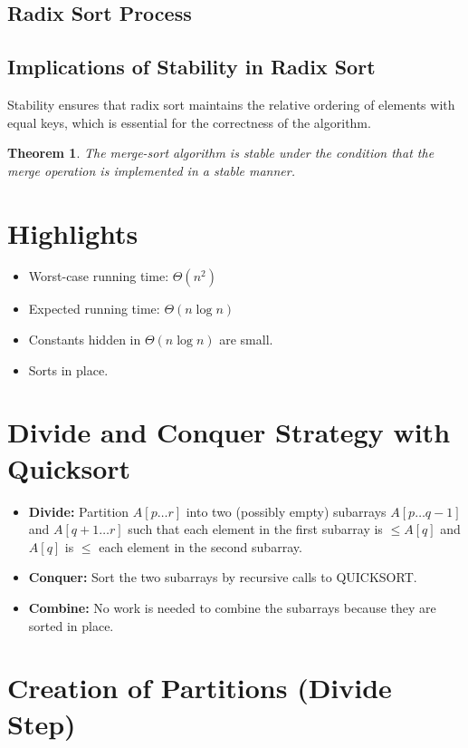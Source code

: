\documentclass[12pt,openany]{book}
\newtheorem{theorem}{Theorem}[chapter]
\theoremstyle{definition}
\begin{document}
	\subsection{Radix Sort Process}
	
	\subsection{Implications of Stability in Radix Sort}
	Stability ensures that radix sort maintains the relative ordering of elements with equal keys, which is essential for the correctness of the algorithm.
	
	\begin{theorem}
		The merge-sort algorithm is stable under the condition that the merge operation is implemented in a stable manner.
	\end{theorem}

\section{Highlights}
\begin{itemize}
	\item Worst-case running time: \( \Theta(n^2) \)
	\item Expected running time: \( \Theta(n \log n) \)
	\item Constants hidden in \( \Theta(n \log n) \) are small.
	\item Sorts in place.
\end{itemize}

\section{Divide and Conquer Strategy with Quicksort}
\begin{itemize}
	\item \textbf{Divide:} Partition \( A[p \ldots r] \) into two (possibly empty) subarrays \( A[p \ldots q-1] \) and \( A[q+1 \ldots r] \) such that each element in the first subarray is \( \leq A[q] \) and \( A[q] \) is \( \leq \) each element in the second subarray.
	\item \textbf{Conquer:} Sort the two subarrays by recursive calls to QUICKSORT.
	\item \textbf{Combine:} No work is needed to combine the subarrays because they are sorted in place.
\end{itemize}

\section{Creation of Partitions (Divide Step)}
\end{document}
